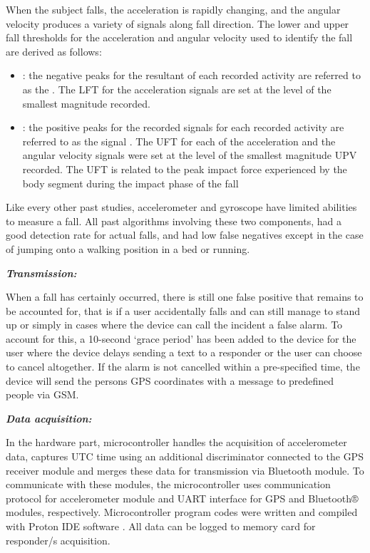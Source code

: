 When the subject falls, the acceleration is rapidly changing, and the angular velocity produces a variety of signals along fall direction. The lower and upper fall thresholds for the acceleration and angular velocity used to identify the fall are derived as follows:

\begin{itemize}
	\item {}: the negative peaks for the resultant of each recorded activity are referred to as the . The LFT for the acceleration signals are set at the level of the smallest magnitude  recorded.

	\item {}: the positive peaks for the recorded signals for each recorded activity are
referred to as the signal . The UFT for each of the acceleration and the angular velocity signals were set at the level of the smallest magnitude UPV  recorded.  The UFT  is related to the peak impact force experienced by the body segment during the impact phase of the fall \cite{Huy13} %
\end{itemize}

Like every other past studies, accelerometer and gyroscope have limited abilities to measure a fall.  All past algorithms involving these two components, had a good detection rate for actual falls, and had low false negatives except in the case of jumping onto a walking position in a bed or running. \cite{Kaz14} %

\noindent \textbf{\textit{Transmission:}}

When a fall has certainly occurred, there is still one false positive that remains to be accounted for, that is if a user accidentally falls and can still manage to stand up or simply in cases where the device can call the incident a false alarm. To account for this, a 10-second ‘grace period’ has been added to the device for the user where the device delays sending a text to a responder or the user can choose to cancel altogether. If the alarm is not cancelled within a pre-specified time, the device will send the persons GPS coordinates with a message to predefined people via GSM.  \cite{Kaz14} %

\noindent \textbf{\textit{Data acquisition:}}

In the hardware part, microcontroller handles the acquisition of accelerometer data, captures UTC time using an additional discriminator connected to the GPS receiver module and merges these data for transmission via Bluetooth module. To communicate with these modules, the microcontroller   uses communication   protocol   for accelerometer module and UART interface for GPS and Bluetooth® modules, respectively. Microcontroller program codes were written and compiled with Proton IDE software \cite{Gur14}. %
All data can be logged to memory card for responder/s acquisition.

